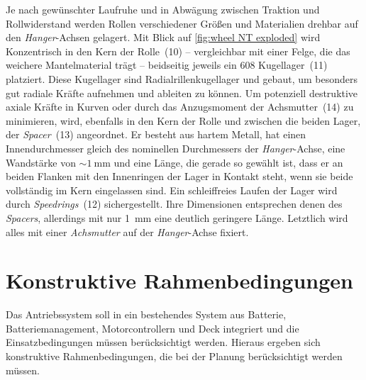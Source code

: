 		Je nach gewünschter Laufruhe und in Abwägung zwischen Traktion und Rollwiderstand werden Rollen verschiedener Größen und Materialien drehbar auf den \textit{Hanger}-Achsen gelagert.
		Mit Blick auf \cref{fig:wheel NT exploded} wird Konzentrisch in den Kern der Rolle~(10) -- vergleichbar mit einer Felge, die das weichere Mantelmaterial trägt -- beidseitig jeweils ein 608 Kugellager~(11) platziert.
		Diese Kugellager sind Radialrillenkugellager und gebaut, um besonders gut radiale Kräfte aufnehmen und ableiten zu können.
		Um potenziell destruktive axiale Kräfte in Kurven oder durch das Anzugsmoment der Achsmutter~(14) zu minimieren, wird, ebenfalls in den Kern der Rolle und zwischen die beiden Lager, der \textit{Spacer}~(13) angeordnet.
		Er besteht aus hartem Metall, hat einen Innendurchmesser gleich des nominellen Durchmessers der \textit{Hanger}-Achse, eine Wandstärke von \(\sim \qty{1}{\milli\metre}\) und eine Länge, die gerade so gewählt ist, dass er an beiden Flanken mit den Innenringen der Lager in Kontakt steht, wenn sie beide vollständig im Kern eingelassen sind.
		Ein schleiffreies Laufen der Lager wird durch \textit{Speedrings}~(12) sichergestellt.
		Ihre Dimensionen entsprechen denen des \textit{Spacers}, allerdings mit nur \qty{1}{\milli\metre} eine deutlich geringere Länge.
		Letztlich wird alles mit einer \textit{Achsmutter} auf der \textit{Hanger}-Achse fixiert.
	\section{Konstruktive Rahmenbedingungen}\label{sec:constructive limitations}
		Das Antriebssystem soll in ein bestehendes System aus Batterie, Batteriemanagement, Motorcontrollern und Deck integriert und die Einsatzbedingungen müssen berücksichtigt werden.
		Hieraus ergeben sich konstruktive Rahmenbedingungen, die bei der Planung berücksichtigt werden müssen.
